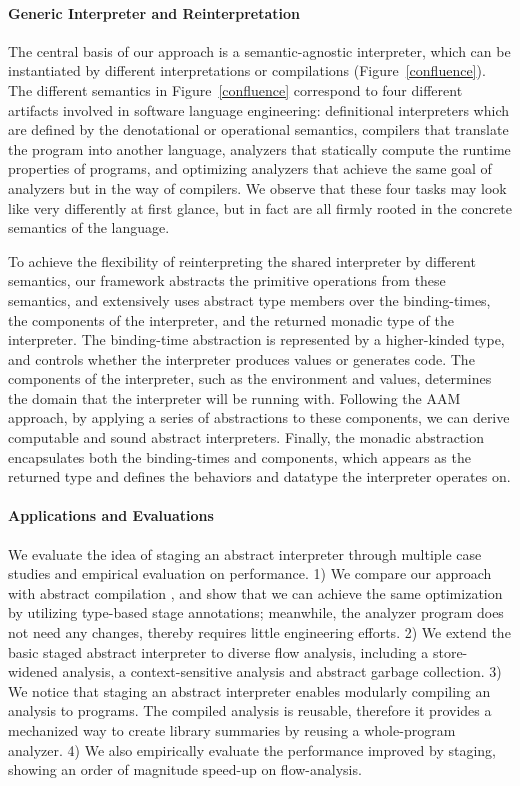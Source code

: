 

\paragraph{Generic Interpreter and Reinterpretation}

The central basis of our approach is a semantic-agnostic interpreter, which can be
instantiated by different interpretations or compilations (Figure~\ref{confluence}).
The different semantics in Figure~\ref{confluence} correspond to four different
artifacts involved in software language engineering: definitional interpreters
which are defined by the denotational or operational semantics, compilers that
translate the program into another language, analyzers that statically compute the
runtime properties of programs, and optimizing analyzers that achieve the same goal
of analyzers but in the way of compilers. We observe that these four
tasks may look like very differently at first glance, but in fact are
all firmly rooted in the concrete semantics of the language.

To achieve the flexibility of reinterpreting the shared interpreter by
different semantics, our framework abstracts the primitive operations
from these semantics, and extensively uses abstract type members over
the binding-times, the components of the interpreter, and the returned
monadic type of the interpreter. The binding-time abstraction is
represented by a higher-kinded type, and controls whether the
interpreter produces values or generates code. The components of the
interpreter, such as the environment and values, determines the domain
that the interpreter will be running with. Following the AAM approach,
by applying a series of abstractions to these components, we can
derive computable and sound abstract interpreters. Finally, the
monadic abstraction encapsulates both the binding-times and
components, which appears as the returned type and defines the
behaviors and datatype the interpreter operates on.

\paragraph{Applications and Evaluations}
We evaluate the idea of staging an abstract interpreter through
multiple case studies and empirical evaluation on performance.
1) We compare our approach with abstract compilation
\cite{Boucher:1996:ACN:647473.727587}, and show that we can achieve
the same optimization by utilizing type-based stage annotations;
meanwhile, the analyzer program does not need any changes, thereby
requires little engineering efforts.
2) We extend the basic staged abstract interpreter to diverse flow
analysis, including a store-widened analysis, a context-sensitive
analysis and abstract garbage collection.
3) We notice that staging an abstract interpreter enables modularly
compiling an analysis to programs. The compiled analysis is reusable,
therefore it provides a mechanized way to create library summaries by
reusing a whole-program analyzer.
4) We also empirically evaluate the performance improved by staging,
showing an order of magnitude speed-up on flow-analysis.

